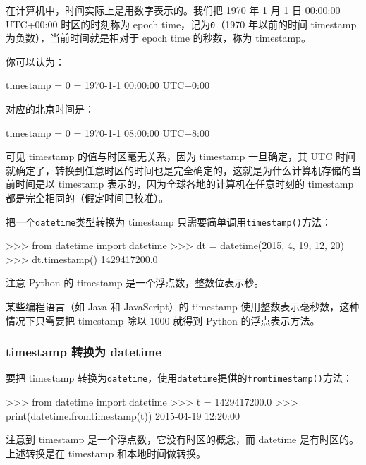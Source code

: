 在计算机中，时间实际上是用数字表示的。我们把 1970 年 1 月 1 日 00:00:00
UTC+00:00 时区的时刻称为 epoch time，记为\texttt{0}（1970 年以前的时间
timestamp 为负数），当前时间就是相对于 epoch time 的秒数，称为
timestamp。

你可以认为：

\begin{pythoncode}
timestamp = 0 = 1970-1-1 00:00:00 UTC+0:00
\end{pythoncode}

对应的北京时间是：

\begin{pythoncode}
timestamp = 0 = 1970-1-1 08:00:00 UTC+8:00
\end{pythoncode}

可见 timestamp 的值与时区毫无关系，因为 timestamp 一旦确定，其 UTC
时间就确定了，转换到任意时区的时间也是完全确定的，这就是为什么计算机存储的当前时间是以
timestamp 表示的，因为全球各地的计算机在任意时刻的 timestamp
都是完全相同的（假定时间已校准）。

把一个\texttt{datetime}类型转换为 timestamp
只需要简单调用\texttt{timestamp()}方法：

\begin{pythoncode}
>>> from datetime import datetime
>>> dt = datetime(2015, 4, 19, 12, 20) 
>>> dt.timestamp() 
1429417200.0
\end{pythoncode}

注意 Python 的 timestamp 是一个浮点数，整数位表示秒。

某些编程语言（如 Java 和 JavaScript）的 timestamp
使用整数表示毫秒数，这种情况下只需要把 timestamp 除以 1000 就得到 Python
的浮点表示方法。

\hypertarget{timestamp-ux8f6cux6362ux4e3a-datetime}{%
\subsubsection{timestamp 转换为
datetime}\label{timestamp-ux8f6cux6362ux4e3a-datetime}}

要把 timestamp
转换为\texttt{datetime}，使用\texttt{datetime}提供的\texttt{fromtimestamp()}方法：

\begin{pythoncode}
>>> from datetime import datetime
>>> t = 1429417200.0
>>> print(datetime.fromtimestamp(t))
2015-04-19 12:20:00
\end{pythoncode}

注意到 timestamp 是一个浮点数，它没有时区的概念，而 datetime
是有时区的。上述转换是在 timestamp 和本地时间做转换。

